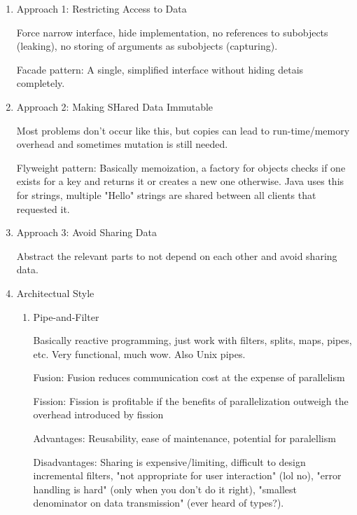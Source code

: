 \documentclass[11pt]{article}
\begin{document}
\begin{enumerate}
\item Approach 1: Restricting Access to Data
\label{sec:org23c3da8}

Force narrow interface, hide implementation, no references to subobjects (leaking), no storing of arguments as subobjects (capturing).

Facade pattern: A single, simplified interface without hiding detais completely.

\item Approach 2: Making SHared Data Immutable
\label{sec:orgc9ca9e4}

Most problems don't occur like this, but copies can lead to run-time/memory overhead and sometimes mutation is still needed.

Flyweight pattern: Basically memoization, a factory for objects checks if one exists for a key and returns it or creates a new one otherwise. Java uses this for strings, multiple "Hello" strings are shared between all clients that requested it.

\item Approach 3: Avoid Sharing Data
\label{sec:org475b041}

Abstract the relevant parts to not depend on each other and avoid sharing data.

\item Architectual Style
\label{sec:org318a9c2}

\begin{enumerate}
\item Pipe-and-Filter
\label{sec:org2654e9e}

Basically reactive programming, just work with filters, splits, maps, pipes, etc. Very functional, much wow. Also Unix pipes.

Fusion: Fusion reduces communication cost at the expense of parallelism

Fission: Fission is profitable if the benefits of parallelization outweigh the overhead introduced by fission

Advantages: Reusability, ease of maintenance, potential for paralellism

Disadvantages: Sharing is expensive/limiting, difficult to design incremental filters, "not appropriate for user interaction" (lol no), "error handling is hard" (only when you don't do it right), "smallest denominator on data transmission" (ever heard of types?).
\end{enumerate}
\end{enumerate}
\end{document}
